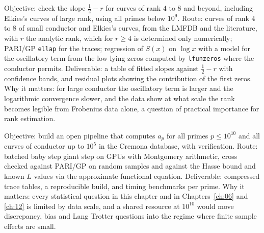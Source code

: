\begin{compproblem}
Objective: check the slope $\frac12 - r$ for curves of rank $4$ to $8$ and beyond, including Elkies's curves of large rank, using all primes below $10^{9}$. Route: curves of rank $4$ to $8$ of small conductor and Elkies's curves, from the LMFDB \cite{lmfdb} and the literature, with $r$ the analytic rank, which for $r\ge4$ is determined only numerically; PARI/GP \texttt{ellap} for the traces; regression of $S(x)$ on $\log x$ with a model for the oscillatory term from the low lying zeros computed by \texttt{lfunzeros} where the conductor permits. Deliverable: a table of fitted slopes against $\frac12 - r$ with confidence bands, and residual plots showing the contribution of the first zeros. Why it matters: for large conductor the oscillatory term is larger and the logarithmic convergence slower, and the data show at what scale the rank becomes legible from Frobenius data alone, a question of practical importance for rank estimation.
\end{compproblem}

\begin{compproblem}
Objective: build an open pipeline that computes $a_p$ for all primes $p\le10^{10}$ and all curves of conductor up to $10^5$ in the Cremona database, with verification. Route: batched baby step giant step on GPUs with Montgomery arithmetic, cross checked against PARI/GP on random samples and against the Hasse bound and known $L$ values via the approximate functional equation. Deliverable: compressed trace tables, a reproducible build, and timing benchmarks per prime. Why it matters: every statistical question in this chapter and in Chapters~\ref{ch:06} and \ref{ch:12} is limited by data scale, and a shared resource at $10^{10}$ would move discrepancy, bias and Lang Trotter questions into the regime where finite sample effects are small.
\end{compproblem}
